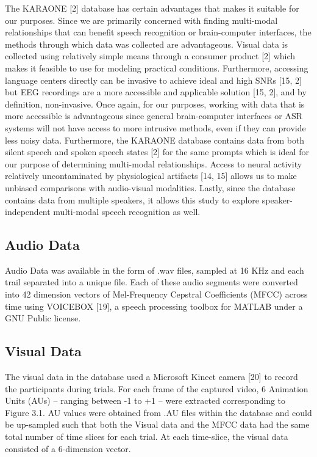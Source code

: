 \documentclass[11pt,letterpaper]{article}
\begin{document}
The KARAONE [2] database has certain advantages that makes it suitable for our purposes. Since we are primarily concerned with finding multi-modal relationships that can benefit speech recognition or brain-computer interfaces, the methods through which data was collected are advantageous. Visual data is collected using relatively simple means through a consumer product [2] which makes it feasible to use for modeling practical conditions. Furthermore, accessing language centers directly can be invasive to achieve ideal and high SNRs [15, 2] but EEG recordings are a more accessible and applicable solution [15, 2], and by definition, non-invasive. Once again, for our purposes, working with data that is more accessible is advantageous since general brain-computer interfaces or ASR systems will not have access to more intrusive methods, even if they can provide less noisy data. Furthermore, the KARAONE database contains data from both silent speech and spoken speech states [2] for the same prompts which is ideal for our purpose of determining multi-modal relationships. Access to neural activity relatively uncontaminated by physiological artifacts [14, 15] allows us to make unbiased comparisons with audio-visual modalities. Lastly, since the database contains data from multiple speakers, it allows this study to explore speaker-independent multi-modal speech recognition as well.  

\subsection{Audio Data}
Audio Data was available in the form of .wav files, sampled at 16 KHz and each trail separated into a unique file. Each of these audio segments were converted into 42 dimension vectors of Mel-Frequency Cepstral Coefficients (MFCC) across time using VOICEBOX [19], a speech processing toolbox for MATLAB under a GNU Public license.

\subsection{Visual Data}
The visual data in the database used a Microsoft Kinect camera [20] to record the participants during trials. For each frame of the captured video, 6 Animation Units (AUs) – ranging between -1 to +1 – were extracted corresponding to Figure 3.1. AU values were obtained from .AU files within the database and could be up-sampled such that both the Visual data and the MFCC data had the same total number of time slices for each trial. At each time-slice, the visual data consisted of a 6-dimension vector.
\end{document}
